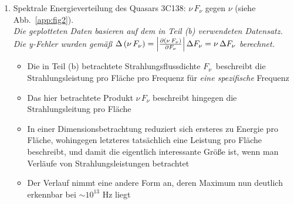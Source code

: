 \documentclass[11pt,a4paper]{scrartcl}
\newcommand*{\figref}[1]{(siehe Abb.~\ref{#1})}
\newcommand{\Fnu}{\ensuremath{{F}_{\nu}}}
\begin{document}
\begin{enumerate}[label=\textbf{\large(\alph*)}]
\vspace*{\baselineskip}

\item
Spektrale Energieverteilung des Quasars 3C138: $\nu\,\Fnu$
gegen $\nu$ \figref{app:fig2}. \\
\textit{\small Die geplotteten Daten basieren auf dem in Teil (b)
    verwendeten Datensatz. Die y-Fehler wurden gemäß
    $\Delta\left(\nu\,\Fnu\right) = \abs{\pdv{(\nu\,\Fnu)}{\Fnu}}\,\Delta\Fnu =
    \nu\,\Delta\Fnu$ berechnet.}

    \begin{itemize}
        \item Die in Teil (b) betrachtete Strahlungsflussdichte
            \Fnu~beschreibt die Strahlungsleistung pro Fläche
            pro Frequenz für \emph{eine spezifische} Frequenz
        \item Das hier betrachtete Produkt $\nu\,\Fnu$
            beschreibt hingegen die Strahlungsleitung pro Fläche
        \item In einer Dimensionsbetrachtung reduziert sich ersteres zu
            Energie pro Fläche, wohingegen letzteres tatsächlich eine Leistung
            pro Fläche beschreibt, und damit die eigentlich interessante Größe
            ist, wenn man Verläufe von Strahlungsleistungen betrachtet
        \item Der Verlauf nimmt eine andere Form an, deren Maximum nun
            deutlich erkennbar bei $\sim 10^{13}$ \si{\hertz} liegt
    \end{itemize}


\end{enumerate}

\newpage


\end{document}
